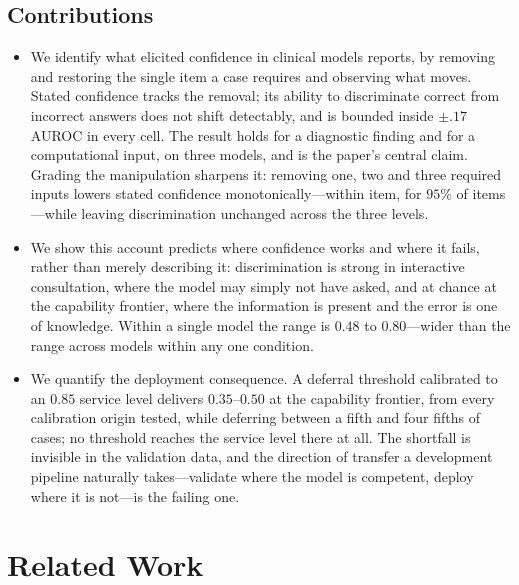 \documentclass[journal,twoside]{IEEEtran}
\begin{document}
\subsection{Contributions}
\begin{itemize}
\item We identify what elicited confidence in clinical models reports, by removing and restoring the
single item a case requires and observing what moves. Stated confidence tracks the removal; its
ability to discriminate correct from incorrect answers does not shift detectably, and is bounded
inside $\pm.17$ AUROC in every cell. The result holds for a diagnostic
finding and for a computational input, on three models, and is the paper's central claim. Grading
the manipulation sharpens it: removing one, two and three required inputs lowers stated confidence
monotonically---within item, for $95\%$ of items---while leaving discrimination unchanged across the
three levels.
\item We show this account predicts where confidence works and where it fails, rather than merely
describing it: discrimination is strong in interactive consultation, where the model may simply not
have asked, and at chance at the capability frontier, where the information is present and the
error is one of knowledge. Within a single model the range is $0.48$ to $0.80$---wider than the
range across models within any one condition.
\item We quantify the deployment consequence. A deferral threshold calibrated to an $0.85$ service
level delivers $0.35$--$0.50$ at the capability frontier, from every calibration origin tested, while
deferring between a fifth and four fifths of cases; no threshold reaches the service level there at
all. The shortfall is invisible in the validation data, and the direction of transfer a development
pipeline naturally takes---validate where the model is competent, deploy where it is not---is the
failing one.
\end{itemize}

\section{Related Work}
\end{document}
